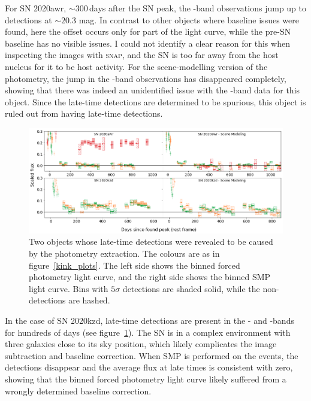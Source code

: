 \documentclass[a4paper,oneside,12pt, class=Latex/Classes/PhDthesisPSnPDF, crop=false]{standalone}
\begin{document}
For SN 2020awr, $\sim300$\,days after the SN peak, the \ztfi-band observations jump up to detections at $\sim20.3$ mag. In contrast to other objects where baseline issues were found, here the offset occurs only for part of the light curve, while the pre-SN baseline has no visible issues. I could not identify a clear reason for this when inspecting the images with \textsc{snap}, and the SN is too far away from the host nucleus for it to be host activity. For the scene-modelling version of the photometry, the jump in the \ztfi-band observations has disappeared completely, showing that there was indeed an unidentified issue with the \ztfi-band data for this object. Since the late-time detections are determined to be spurious, this object is ruled out from having late-time detections.

\begin{figure}
 \centering
 \includegraphics[width=\textwidth]{../Images/chapter_3/other_red_err_plots.png}
 \caption[Objects whose late-time signal was due to photometry issues.]{Two objects whose late-time detections were revealed to be caused by the photometry extraction. The colours are as in figure~\ref{kink_plots}. The left side shows the binned forced photometry light curve, and the right side shows the binned SMP light curve. Bins with $5\sigma$ detections are shaded solid, while the non-detections are hashed.}
 \label{other_red_errs}
\end{figure}

In the case of SN 2020kzd, late-time detections are present in the \ztfg- and \ztfr-bands for hundreds of days (see figure~\ref{other_red_errs}). The SN is in a complex environment with three galaxies close to its sky position, which likely complicates the image subtraction and baseline correction. When SMP is performed on the events, the detections disappear and the average flux at late times is consistent with zero, showing that the binned forced photometry light curve likely suffered from a wrongly determined baseline correction.
\end{document}
